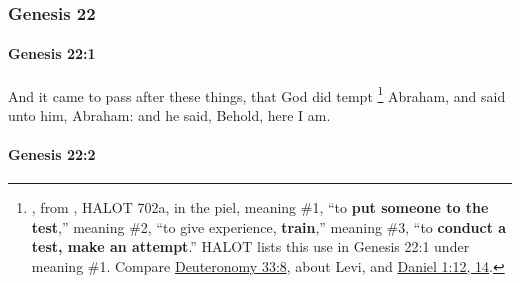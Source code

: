 	\subsubsection{Genesis 22} %
		\label{GENESIS-22}

		\paragraph{Genesis 22:1} %
			\label{GENESIS-22-1}

			And it came to pass after these things, that God did tempt%
				\footnote{%
					, from \hyperref[NASAH]{}, HALOT 702a, in the piel, meaning \#1, ``to \textbf{put someone to the test},'' meaning \#2, ``to give experience, \textbf{train},'' meaning \#3, ``to \textbf{conduct a test, make an attempt}.'' HALOT lists this use in Genesis 22:1 under meaning \#1. Compare \hyperref[DEUTERONOMY-33-8]{Deuteronomy 33:8}, about Levi, and \hyperref[DANIEL-1-12]{Daniel 1:12, 14}.
					}
			Abraham, and said unto him, Abraham: and he said, Behold, here I am.

			\begin{framed}
			\scriptsize
				\begin{compactdesc}
					\item[LXX] 
				\end{compactdesc}
			\end{framed}

		\paragraph{Genesis 22:2} %
			\label{GENESIS-22-2}

